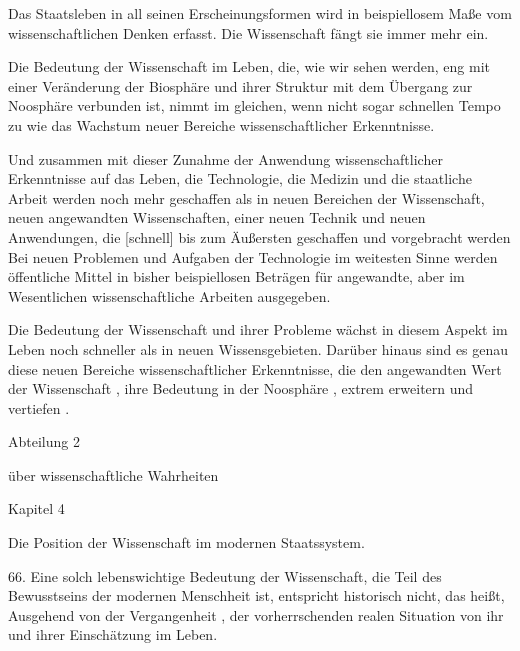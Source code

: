 \documentclass[11pt,a4paper]{book}
\begin{document}
Das Staatsleben in all seinen Erscheinungsformen wird in beispiellosem Maße vom wissenschaftlichen Denken erfasst. Die Wissenschaft fängt sie immer mehr ein.



Die Bedeutung der Wissenschaft im Leben, die, wie wir sehen werden, eng mit einer Veränderung der Biosphäre und ihrer Struktur mit dem Übergang zur Noosphäre verbunden ist, nimmt im gleichen, wenn nicht sogar schnellen Tempo zu wie das Wachstum neuer Bereiche wissenschaftlicher Erkenntnisse.



Und zusammen mit dieser Zunahme der Anwendung wissenschaftlicher Erkenntnisse auf das Leben, die Technologie, die Medizin und die staatliche Arbeit werden noch mehr geschaffen als in neuen Bereichen der Wissenschaft, neuen angewandten Wissenschaften, einer neuen Technik und neuen Anwendungen, die [schnell] bis zum Äußersten geschaffen und vorgebracht werden Bei neuen Problemen und Aufgaben der Technologie im weitesten Sinne werden öffentliche Mittel in bisher beispiellosen Beträgen für angewandte, aber im Wesentlichen wissenschaftliche Arbeiten ausgegeben.



Die Bedeutung der Wissenschaft und ihrer Probleme wächst in diesem Aspekt im Leben noch schneller als in neuen Wissensgebieten. Darüber hinaus sind es genau diese neuen Bereiche wissenschaftlicher Erkenntnisse, die den angewandten Wert der Wissenschaft , ihre Bedeutung in der Noosphäre , extrem erweitern und vertiefen .



 



Abteilung 2

über wissenschaftliche Wahrheiten



 



Kapitel 4



 



Die Position der Wissenschaft im modernen Staatssystem.



 





66. Eine solch lebenswichtige Bedeutung der Wissenschaft, die Teil des Bewusstseins der modernen Menschheit ist, entspricht historisch nicht, das heißt, Ausgehend von der Vergangenheit , der vorherrschenden realen Situation von ihr und ihrer Einschätzung im Leben.
\end{document}
